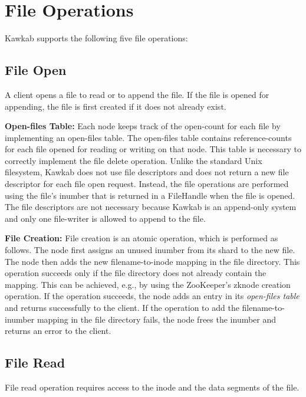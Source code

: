 \documentclass[]{article}
\newcommand{\subtopic}[1]{\vspace{1.5pt} \noindent \textbf{#1}}
\begin{document}
\section{File Operations}

Kawkab supports the following five file operations:

\subsection{File Open}

A client opens a file to read or to append the file. If the file is opened for
appending, the file is first created if it does not already exist. 

\subtopic{Open-files Table:} Each node keeps track of the open-count for each
file by implementing an open-files table.  The open-files table contains
reference-counts for each file opened for reading or writing on that node.
This table is necessary to correctly implement the file delete operation.
Unlike the standard Unix filesystem, Kawkab does not use file descriptors and
does not return a new file descriptor for each file open request.  Instead, the
file operations are performed using the file's inumber that is returned in a
FileHandle when the file is opened.  The file descriptors are not necessary
because Kawkab is an append-only system and only one file-writer is allowed to
append to the file.


\subtopic{File Creation:} File creation is an atomic operation, which is
performed as follows.
The node first assigns an unused inumber from its shard to the new file.  The
node then adds the new filename-to-inode mapping in the file directory.  This
operation succeeds only if the file directory does not already contain the
mapping. This can be achieved, e.g., by using the ZooKeeper's zknode creation
operation.  If the operation succeeds, the node adds an entry in its
\textit{open-files table} and returns successfully to the client.  If the
operation to add the filename-to-inumber mapping in the file directory fails,
the node frees the inumber and returns an error to the client.  


\subsection{File Read}

File read operation requires access to the inode and the data segments of the
file. 
\end{document}
